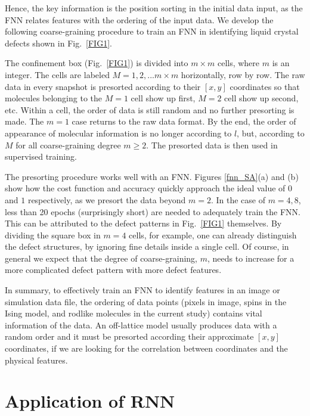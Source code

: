 Hence, the key information is the position sorting in the initial data input, as the FNN relates features with the ordering of the input data. We develop the following coarse-graining procedure to train an FNN in identifying liquid crystal defects shown in Fig.~\ref{FIG1}.

The confinement box (Fig.~\ref{FIG1}) is divided into $m\times m$ cells, where $m$ is an integer. The cells are labeled $M=1,2,...m\times m$ horizontally, row by row.
The raw data in every snapshot is presorted according to their $[x,y]$ coordinates so that molecules belonging to the $M=1$ cell show up first, $M=2$ cell show up second, etc. Within a cell, the order of data is still random and no further presorting is made. The $m=1$ case returns to the raw data format. By the end, the order of appearance of molecular information is no longer according to $l$, but, according to $M$ for all coarse-graining degree $m\ge 2$. The presorted data is then used in supervised training.

The presorting procedure works well with an FNN. Figures \ref{fnn_SA}(a) and (b) show how the cost function and accuracy quickly approach the ideal value of $0$ and $1$ respectively, as we presort the data beyond $m=2$.
In the case of $m=4, 8$, less than 20 epochs (surprisingly short) are needed to adequately train the FNN. This can be attributed to the defect patterns in Fig.\ \ref{FIG1} themselves. By dividing the square box in $m=4$ cells, for example, one can already distinguish the defect structures, by ignoring fine details inside a single cell.
Of course,  in general we expect that the degree of coarse-graining, $m$, needs to increase for a more complicated defect pattern with more defect features.

In summary, to effectively train an FNN to identify features in an image or simulation data file, the ordering of data points (pixels in image, spins in the Ising model, and rodlike molecules in the current study) contains vital information of the data. An off-lattice model usually produces data with a random order and it must be presorted according their approximate $[x,y]$ coordinates, if we are looking for the correlation between coordinates and the physical features.

\section{Application of RNN}\label{RNN}

